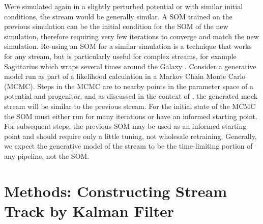 \documentclass[fleqn,usenatbib]{mnras}
\begin{document}
    
      Were  simulated again in a slightly perturbed potential
      or with similar initial conditions, the stream would be generally similar.
      A SOM trained on the previous simulation can be the initial condition for
      the SOM of the new simulation, therefore requiring very few iterations to
      converge and match the new simulation. Re-using an SOM for a similar
      simulation is a technique that works for any stream, but is particularly
      useful for complex streams, for example Sagittarius which wraps several
      times around the Galaxy \citep{Koposov2012}. Consider a generative model
      run as part of a likelihood calculation in a Markov Chain Monte Carlo
      (MCMC). Steps in the MCMC are to nearby points in the parameter space of a
      potential and progenitor, and as discussed in the context of
      , the  generated mock stream will be similar to the
      previous stream. For the initial state of the MCMC the SOM must either run
      for many iterations or have an informed starting point. For subsequent
      steps, the previous SOM may be used as an informed starting point and
      should require only a little tuning, not wholesale retraining. Generally,
      we expect the generative model of the stream to be the time-limiting
      portion of any pipeline, not the SOM.








\section{Methods: Constructing Stream Track by Kalman Filter}
\label{sec:kalman_filter}
\end{document}
